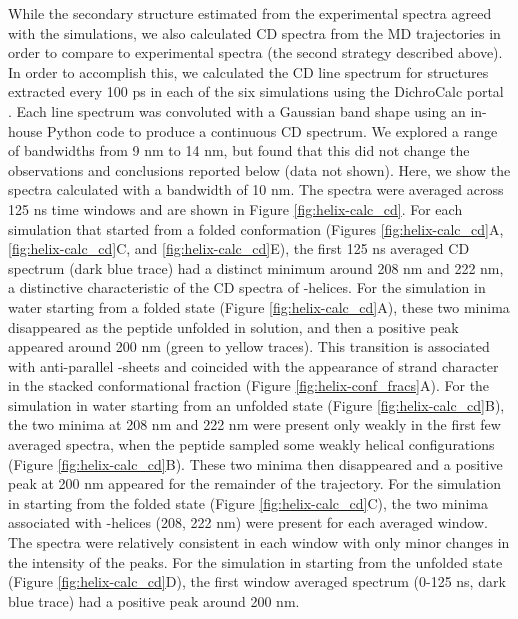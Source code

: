 While the secondary structure estimated from the experimental spectra agreed with the simulations, we also calculated CD spectra from the MD trajectories in order to compare to experimental spectra (the second strategy described above). 
In order to accomplish this, we calculated the CD line spectrum for structures extracted every 100 ps in each of the six simulations using the DichroCalc portal \cite{Bulheller2009, Jasim2018}. 
Each line spectrum was convoluted with a Gaussian band shape using an in-house Python code to produce a continuous CD spectrum. 
We explored a range of bandwidths from 9 nm to 14 nm, but found that this did not change the observations and conclusions reported below (data not shown). 
Here, we show the spectra calculated with a bandwidth of 10 nm. 
The spectra were averaged across 125 ns time windows and are shown in Figure \ref{fig:helix-calc_cd}. 
For each simulation that started from a folded conformation (Figures \ref{fig:helix-calc_cd}A, \ref{fig:helix-calc_cd}C, and \ref{fig:helix-calc_cd}E), the first 125 ns averaged CD spectrum (dark blue trace) had a distinct minimum around 208 nm and 222 nm, a distinctive characteristic of the CD spectra of \textalpha{}-helices\cite{Holzwarth1965, Woody1967, Johnson1988, Berova2000circular, Kelly2005}.
For the simulation in water starting from a folded state (Figure \ref{fig:helix-calc_cd}A), these two minima disappeared as the peptide unfolded in solution, and then a positive peak appeared around 200 nm (green to yellow traces). 
This transition is associated with anti-parallel \textbeta{}-sheets\cite{Greenfield1969, Manning1988} and coincided with the appearance of strand character in the stacked conformational fraction (Figure \ref{fig:helix-conf_fracs}A). 
For the simulation in water starting from an unfolded state (Figure \ref{fig:helix-calc_cd}B), the two minima at 208 nm and 222 nm were present only weakly in the first few averaged spectra, when the peptide sampled some weakly helical configurations (Figure \ref{fig:helix-calc_cd}B). 
These two minima then disappeared and a positive peak at 200 nm appeared for the remainder of the trajectory. 
For the simulation in \tbawat{} starting from the folded state (Figure \ref{fig:helix-calc_cd}C), the two minima associated with \textalpha{}-helices (208, 222 nm) were present for each averaged window. 
The spectra were relatively consistent in each window with only minor changes in the intensity of the peaks. 
For the simulation in \tbawat{} starting from the unfolded state (Figure \ref{fig:helix-calc_cd}D), the first window averaged spectrum (0-125 ns, dark blue trace) had a positive peak around 200 nm. 
